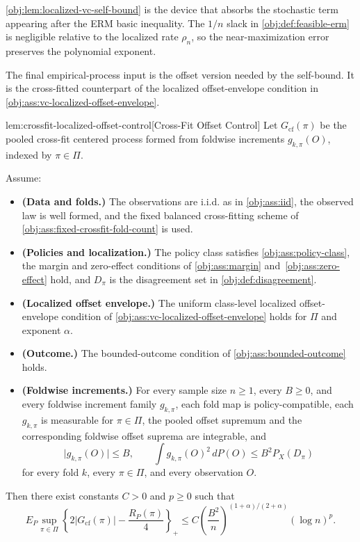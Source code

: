 \documentclass[11pt]{article}
\begin{document}
\cref{obj:lem:localized-vc-self-bound} is the device that absorbs the stochastic term appearing after the ERM basic inequality.  The \(1/n\) slack in \cref{obj:def:feasible-erm} is negligible relative to the localized rate \(\rho_n\), so the near-maximization error preserves the polynomial exponent.

The final empirical-process input is the offset version needed by the self-bound.  It is the cross-fitted counterpart of the localized offset-envelope condition in \cref{obj:ass:vc-localized-offset-envelope}.

\begin{lemmav}{lem:crossfit-localized-offset-control}[Cross-Fit Offset Control]
Let \(G_{\mathrm{cf}}(\pi)\) be the pooled cross-fit centered process formed from foldwise increments \(g_{k,\pi}(O)\), indexed by \(\pi\in\Pi\).

Assume:
\begin{itemize}
\item \textbf{(Data and folds.)} The observations are i.i.d. as in \cref{obj:ass:iid}, the observed law is well formed, and the fixed balanced cross-fitting scheme of \cref{obj:ass:fixed-crossfit-fold-count} is used.
\item \textbf{(Policies and localization.)} The policy class satisfies \cref{obj:ass:policy-class}, the margin and zero-effect conditions of \cref{obj:ass:margin} and~\cref{obj:ass:zero-effect} hold, and \(D_\pi\) is the disagreement set in \cref{obj:def:disagreement}.
\item \textbf{(Localized offset envelope.)} The uniform class-level localized offset-envelope condition of \cref{obj:ass:vc-localized-offset-envelope} holds for \(\Pi\) and exponent \(\alpha\).
\item \textbf{(Outcome.)} The bounded-outcome condition of \cref{obj:ass:bounded-outcome} holds.
\item \textbf{(Foldwise increments.)} For every sample size \(n\ge1\), every \(B\ge0\), and every foldwise increment family \(g_{k,\pi}\), each fold map is policy-compatible, each \(g_{k,\pi}\) is measurable for \(\pi\in\Pi\), the pooled offset supremum and the corresponding foldwise offset suprema are integrable, and
\[
\lvert g_{k,\pi}(O)\rvert\le B,
\qquad
\int g_{k,\pi}(O)^2\,dP(O)
\le B^2 P_X(D_\pi)
\]
for every fold \(k\), every \(\pi\in\Pi\), and every observation \(O\).
\end{itemize}
Then there exist constants \(C>0\) and \(p\ge0\) such that
\[
E_P \sup_{\pi\in\Pi}
\left\{2\lvert G_{\mathrm{cf}}(\pi)\rvert-\frac{R_P(\pi)}{4}\right\}_{+}
\le
C\left(\frac{B^2}{n}\right)^{(1+\alpha)/(2+\alpha)}(\log n)^p .
\]
\end{lemmav}
\end{document}
